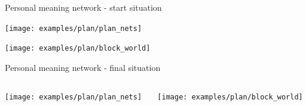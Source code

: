 \documentclass[default]{beamer}
\begin{document}
	\begin{frame}{Personal meaning network - start situation}
		
		\centering
		\texttt{[image: examples/plan/plan\_nets]}
		\par\bigskip
		\texttt{[image: examples/plan/block\_world]}
	\end{frame}	
	
	\begin{frame}{Personal meaning network - final situation}
		\begin{columns}
		\begin{column}{0.7\textwidth}
		\centering
		\texttt{[image: examples/plan/plan\_nets]}
		\end{column}
		\begin{column}{0.3\textwidth}
		\centering
		\texttt{[image: examples/plan/block\_world]}
		\end{column}
		\end{columns}
	\end{frame}	
	
\end{document}
